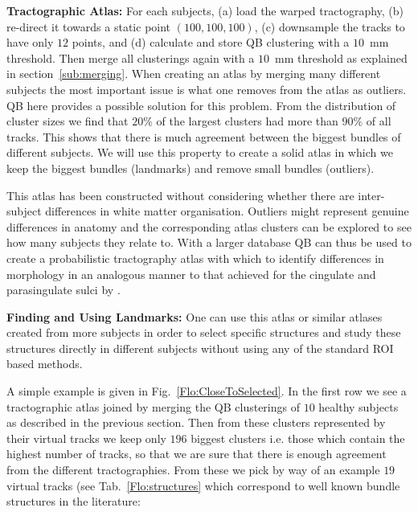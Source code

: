 \documentclass[journal]{IEEEtran}
\begin{document}
\textbf{Tractographic Atlas:} For each subjects, (a) load the warped
tractography, (b) re-direct it towards a static point $(100,100,100)$, 
(c) downsample the tracks to have only $12$ points, and (d) calculate
and store QB clustering with a $10$~mm threshold. Then merge all
clusterings again with a $10$~mm threshold as explained in
section~\ref{sub:merging}. When creating an atlas by merging
many different subjects the most important issue is what one removes
from the atlas as outliers.  QB here provides a possible solution for
this problem. From the distribution of cluster sizes we find that $20\%$
of the largest clusters had more than $90\%$ of all tracks. This shows
that there is much agreement between the biggest bundles of different
subjects.  We will use this property to create a solid atlas in which we
keep the biggest bundles (landmarks) and remove small bundles
(outliers).

This atlas has been constructed without considering whether there are
inter-subject differences in white matter organisation. Outliers might
represent genuine differences in anatomy and the corresponding atlas
clusters can be explored to see how many subjects they relate to. With a
larger database QB can thus be used to create a probabilistic
tractography atlas with which to identify differences in morphology in
an analogous manner to that achieved for the cingulate and parasingulate
sulci by \cite{paus1996human}.

\textbf{Finding and Using Landmarks:} One can use this atlas or similar
atlases created from more subjects in order to select specific
structures and study these structures directly in different subjects
without using any of the standard ROI based methods.

A simple example is given in Fig.~\ref{Flo:CloseToSelected}. In the
first row we see a tractographic atlas joined by merging the QB
clusterings of $10$ healthy subjects as described in the previous
section. Then from these clusters represented by their virtual tracks we
keep only $196$ biggest clusters i.e. those which contain the highest
number of tracks, so that we are sure that there is enough agreement
from the different tractographies. From these we pick by way of an
example $19$ virtual tracks (see Tab.~\ref{Flo:structures} which
correspond to well known bundle structures in the literature:
\end{document}

